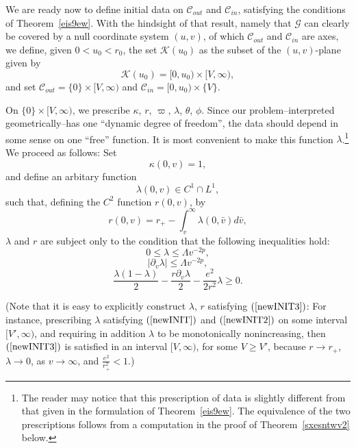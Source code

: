 \documentclass{article}
\begin{document}
We are ready now to define initial data 
on $\mathcal{C}_{out}$ and $\mathcal{C}_{in}$, satisfying
the conditions of  Theorem~\ref{eis9ew}.
With the hindsight of that result, namely that $\mathcal{G}$
can clearly be covered by a null coordinate system $(u,v)$, of which
$\mathcal{C}_{out}$ and $\mathcal{C}_{in}$ are axes, we define,
given $0<u_0<r_0$, the set $\mathcal{K}(u_0)$ as the subset of 
the $(u,v)$-plane given by
\[
\mathcal{K}(u_0)=[0,u_0)\times[V,\infty),
\]
and set $\mathcal{C}_{out}=\{0\}\times[V,\infty)$ 
and $\mathcal{C}_{in}=[0,u_0)\times \{V\}$. 

On $\{0\}\times[V,\infty)$, we prescribe 
$\kappa$, $r$, 
$\varpi$, $\lambda$, $\theta$, $\phi$.
Since our problem--interpreted geometrically--has one
``dynamic degree of freedom'', the data should depend in some sense
on one ``free'' function. It is most convenient to make this function
$\lambda$.\footnote{The reader may
notice that this prescription of data is slightly different
from that given in the formulation of Theorem~\ref{eis9ew}. 
The equivalence of the two prescriptions follows
from a computation in the
proof of Theorem~\ref{sxesntwv2} below.}
We proceed as follows:
Set
\begin{equation}
\label{INITv1}
\kappa(0,v)=1,
\end{equation}
and define an arbitary
function 
\begin{equation}
\label{au9aireto}
\lambda(0,v)\in C^1\cap L^1,
\end{equation}
such that, defining 
the $C^2$ function $r(0,v)$,
by
\begin{equation}
\label{rdef}
r(0, v)=r_+-\int_{v}^{\infty}\lambda(0,\bar{v})d\bar{v},
\end{equation}
$\lambda$ and $r$ are
subject only to the condition that the following inequalities hold:
\begin{equation}
\label{newINIT}
0\le\lambda\le \Lambda v^{-2p},
\end{equation}
\begin{equation}
\label{newINIT2}
|\partial_v\lambda|\le \Lambda v^{-2p},
\end{equation}
\begin{equation}
\label{newINIT3}
\frac{\lambda(1-\lambda)}2-\frac{r\partial_v\lambda}2
-\frac{e^2}{2r^2}\lambda\ge0.
\end{equation}



(Note that it is easy to explicitly construct $\lambda$, $r$ satisfying
$(\ref{newINIT3})$: For instance, prescribing $\lambda$ satisfying
$(\ref{newINIT})$ and $(\ref{newINIT2})$ on
some interval $[V',\infty)$, and requiring in addition $\lambda$
to be monotonically nonincreasing, then 
$(\ref{newINIT3})$ is satisfied
in an interval $[V,\infty)$, for some $V\ge V'$,
because $r\to r_+$, $\lambda\to0$, as $v\to\infty$, and
$\frac{e^2}{r_+^2}<1$.)
\end{document}
